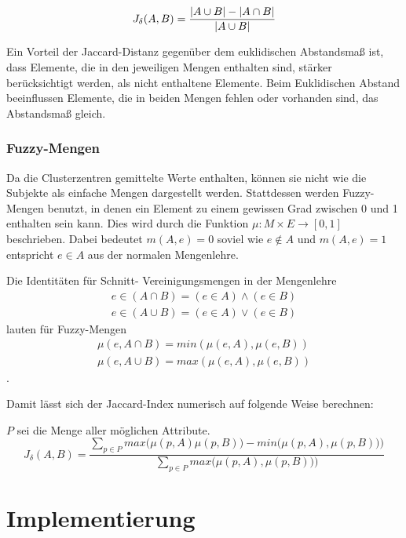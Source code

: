 \documentclass[a4paper]{llncs}
\begin{document}

$$J_{\delta}(A,B) = %
{ { |A \cup B| - |A \cap B| } \over |A \cup B| }$$

Ein Vorteil der Jaccard-Distanz gegenüber dem euklidischen Abstandsmaß ist, dass Elemente, die in den jeweiligen Mengen enthalten sind, stärker berücksichtigt werden, als nicht enthaltene Elemente. Beim Euklidischen Abstand beeinflussen Elemente, die in beiden Mengen fehlen oder vorhanden sind, das Abstandsmaß gleich.

\subsubsection{Fuzzy-Mengen}
\label{sec:Fuzzy}
Da die Clusterzentren gemittelte Werte enthalten, können sie nicht wie die Subjekte als einfache Mengen dargestellt werden.
Stattdessen werden Fuzzy-Mengen benutzt, in denen ein Element zu einem gewissen Grad zwischen 0 und 1 enthalten sein kann.
Dies wird durch die Funktion $\mu : M \times E \rightarrow [0,1] $ beschrieben. Dabei bedeutet $m(A,e) = 0$ soviel wie $ e \not\in A $ und $m(A,e) = 1$ entspricht $ e \in A $ aus der normalen Mengenlehre.

Die Identitäten für Schnitt- Vereinigungsmengen in der Mengenlehre \begin{align*}e \in (A \cap B) = (e \in A) \wedge (e \in B)
	\\ e \in (A \cup B) = (e \in A) \vee (e \in B) \end{align*} lauten für Fuzzy-Mengen  \begin{align*}\mu(e, A \cap B) = min(\mu(e, A), \mu(e, B))\\ \mu(e, A \cup B) = max(\mu(e, A), \mu(e, B))  \end{align*}.

Damit lässt sich der Jaccard-Index numerisch auf folgende Weise berechnen:

$P$ sei die Menge aller möglichen Attribute.
$$J_{\delta}(A,B) = \frac{\sum\limits_{p \in P}max\bigl(\mu(p, A)\mu(p, B)\bigr) - min\bigl(\mu(p, A),\mu(p, B))\bigr)}{\sum\limits_{p \in P}max\bigl(\mu(p, A),\mu(p, B))\bigr)}$$

\section{Implementierung}
\end{document}
